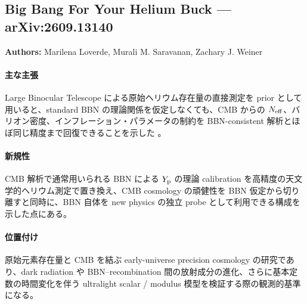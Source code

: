 \subsection{Big Bang For Your Helium Buck --- arXiv:2609.13140}

\textbf{Authors:} Marilena Loverde, Murali M. Saravanan, Zachary J. Weiner

\paragraph{主な主張}
Large Binocular Telescope による原始ヘリウム存在量の直接測定を prior として用いると、standard BBN の理論関係を仮定しなくても、CMB からの $N_{\rm eff}$、バリオン密度、インフレーション・パラメータの制約を BBN-consistent 解析とほぼ同じ精度まで回復できることを示した \cite{Loverde:2026helium}。

\paragraph{新規性}
CMB 解析で通常用いられる BBN による $Y_{\rm p}$ の理論 calibration を高精度の天文学的ヘリウム測定で置き換え、CMB cosmology の頑健性を BBN 仮定から切り離すと同時に、BBN 自体を new physics の独立 probe として利用できる構成を示した点にある。

\paragraph{位置付け}
原始元素存在量と CMB を結ぶ early-universe precision cosmology の研究であり、dark radiation や BBN--recombination 間の放射成分の進化、さらに基本定数の時間変化を伴う ultralight scalar / modulus 模型を検証する際の観測的基準になる。
